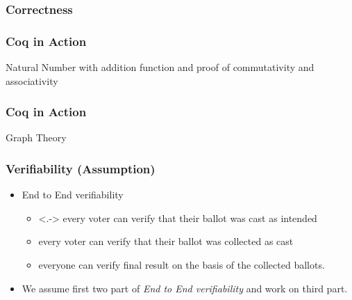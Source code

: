 \documentclass{beamer}
\begin{document}
\begin{frame}
\frametitle{Correctness}
\begin{center}
\end{center}
\end{frame}

\begin{frame}
\frametitle{Coq in Action}
{Natural Number with addition function and proof of 
commutativity and associativity}
\lsteighteen
\end{frame}


\begin{frame}
\frametitle{Coq in Action}
{Graph Theory}
\lstf
\end{frame}

\begin{frame}
\frametitle{Verifiability (Assumption)}
\begin{itemize}
\item End to End verifiability
\begin{itemize}
  \item<.-> every voter can verify that their ballot was cast as
  intended
  \item every voter can verify that their ballot was collected as
  cast
  \item everyone can verify final result on the basis of the
  collected ballots.
\end{itemize}

\item We assume first two part of \textit{End to End verifiability} and work on
      third part.
\end{itemize}
\end{frame}
\end{document}
